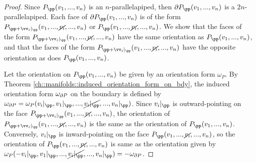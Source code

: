 \begin{proof}
    Since $P_\pp(v_1, ..., v_n)$ is an $n$-parallelapiped, then $\pd P_\pp(v_1, ..., v_n)$ is a $2n$-parallelapiped. Each face of $\pd P_\pp(v_1, ..., v_n)$ is of the form $P_{\pp + \vv_i|_\pp}(v_1, ..., \cancel{v_i}, ..., v_n)$ or $P_{\pp}(v_1, ..., \cancel{v_i}, ..., v_n)$. We show that the faces of the form $P_{\pp + \vv_i|_\pp}(v_1, ..., \cancel{v_i}, ..., v_n)$ have the same orientation as $P_\pp(v_1, ..., v_n)$, and that the faces of the form $P_{\pp + \vv_i|_\pp}(v_1, ..., \cancel{v_i}, ..., v_n)$ have the opposite orientation as does $P_\pp(v_1, ..., v_n)$.
    
    Let the orientation on $P_\pp(v_1, ..., v_n)$ be given by an orientation form $\omega_P$. By Theorem \ref{ch::manifolds::induced_orientation_form_on_bdy}, the induced orientation form $\omega_{\partial P}$ on the boundary is defined by $\omega_{\pd P} = \omega_P(v_i|_\pp, v_1|_\pp, ..., \cancel{v_i|_\pp}, ..., v_n|_\pp)$. Since $v_i|_\pp$ is outward-pointing on the face $P_{\pp + \vv_i|_\pp}(v_1, ..., \cancel{v_i}, ..., v_n)$, the orientation of $P_{\pp + \vv_i|_\pp}(v_1, ..., \cancel{v_i}, ..., v_n)$ is the same as the orientation of $P_\pp(v_1, ..., v_n)$. Conversely, $v_i|_\pp$ is inward-pointing on the face $P_{\pp}(v_1, ..., \cancel{v_i}, ..., v_n)$, so the orientation of $P_{\pp}(v_1, ..., \cancel{v_i}, ..., v_n)$ is same as the orientation given by $\omega_P(-v_i|_\pp, v_1|_\pp, ..., \cancel{v_i|_\pp}, ..., v_n|_\pp) = -\omega_{\pd P}$.
\end{proof}
